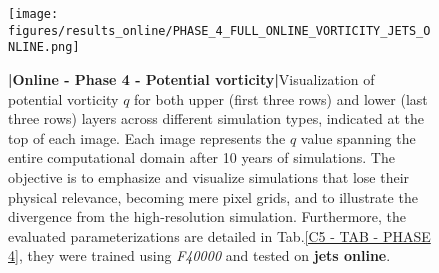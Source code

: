 %
%
\newpage

\begin{figure}[H]
    \centering
    \texttt{[image: figures/results\_online/PHASE\_4\_FULL\_ONLINE\_VORTICITY\_JETS\_ONLINE.png]}
    \caption{\textbf{|}\textcolor{section_color}{\textbf{Online - Phase 4 - Potential vorticity}}\textbf{|}Visualization of potential vorticity $q$ for both upper (first three rows) and lower (last three rows) layers across different simulation types, indicated at the top of each image. Each image represents the $q$ value spanning the entire computational domain after 10 years of simulations. The objective is to emphasize and visualize simulations that lose their physical relevance, becoming mere pixel grids, and to illustrate the divergence from the high-resolution simulation. Furthermore, the evaluated parameterizations are detailed in Tab.\ref{C5 - TAB - PHASE 4}, they were trained using \textit{F40000} and tested on \textbf{jets online}.}
    \label{APP - ONLINE - PHASE 4 - VORTICITY -  FULL 40000 and JETS ONLINE}
\end{figure}